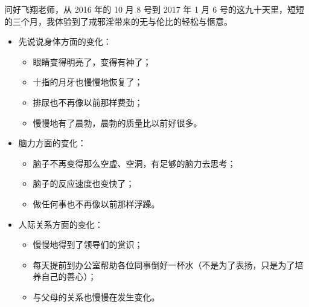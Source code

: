 \begin{case}
    问好飞翔老师，从 2016 年的 10 月 8 号到 2017 年 1 月 6 号的这九十天里，短短的三个月，我体验到了戒邪淫带来的无与伦比的轻松与惬意。

    \begin{itemize}
        \item 先说说身体方面的变化：\begin{itemize}
                  \item 眼睛变得明亮了，变得有神了；
                  \item 十指的月牙也慢慢地恢复了；
                  \item 排尿也不再像以前那样费劲；
                  \item 慢慢地有了晨勃，晨勃的质量比以前好很多。
              \end{itemize}
        \item 脑力方面的变化：\begin{itemize}
                  \item 脑子不再变得那么空虚、空洞，有足够的脑力去思考；
                  \item 脑子的反应速度也变快了；
                  \item 做任何事也不再像以前那样浮躁。
              \end{itemize}
        \item 人际关系方面的变化：\begin{itemize}
                  \item 慢慢地得到了领导们的赏识；
                  \item 每天提前到办公室帮助各位同事倒好一杯水（不是为了表扬，只是为了培养自己的善心）；
                  \item 与父母的关系也慢慢在发生变化。
              \end{itemize}
    \end{itemize}


\end{case}
